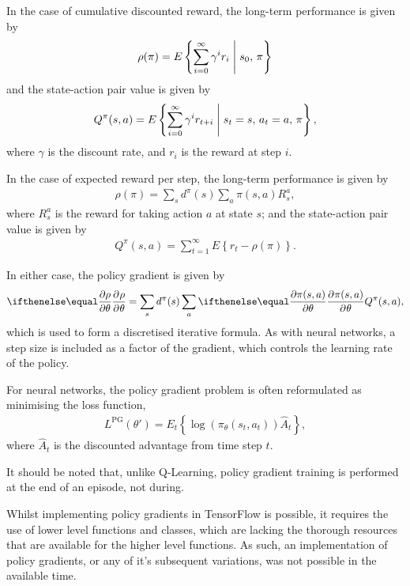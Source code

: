 In the case of cumulative discounted reward, the long-term performance is given
by
\begin{align*}
    \rho(\pi) = E\left\{
        \sum_{i=0}^{\infty} \gamma^{i}r_{i}
        \;\middle|\; s_0,\, \pi
    \right\}
\end{align*}
and the state-action pair value is given by
\begin{align*}
    Q^\pi(s,a) = E\left\{
        \sum_{i=0}^{\infty} \gamma^{i}r_{t+i}
        \;\middle|\; s_t=s,\, a_t=a,\, \pi
    \right\},
\end{align*}
where $\gamma$ is the discount rate, and $r_i$ is the reward at step $i$.

In the case of expected reward per step, the long-term performance is given by
\begin{align*}
    \rho(\pi) = \sum_s d^\pi(s) \sum_a \pi(s,a) R_s^a,
\end{align*}
where $R_s^a$ is the reward for taking action $a$ at state $s$;
and the state-action pair value is given by
\begin{align*}
    Q^\pi(s,a) = \sum_{t=1}^{\infty} E\left\{
        r_t - \rho(\pi)
    \right\}.
\end{align*}

In either case, the policy gradient is given by
\begin{align*}
    \Rpdiff{\rho}{\theta} =
    \sum_s d^\pi(s)
    \sum_a \Rpdiff{\pi(s,a)}{\theta}
    Q^\pi(s,a),
\end{align*}
which is used to form a discretised iterative formula.
As with neural networks, a step size is included as a factor of the
gradient, which controls the learning rate of the policy.

For neural networks, the policy gradient problem is often reformulated as
minimising the loss function,
\begin{align*}
    L^\text{PG}(\theta') = E_t\left\{
        \log(\pi_\theta(s_t,a_t))\hat{A}_t
    \right\},
\end{align*}
where $\hat{A}_t$ is the discounted advantage from time step $t$.

It should be noted that, unlike Q-Learning, policy gradient training is
performed at the end of an episode, not during.

Whilst implementing policy gradients in TensorFlow is possible, it requires the
use of lower level functions and classes, which are lacking the thorough
resources that are available for the higher level functions.
As such, an implementation of policy gradients, or any of it's subsequent
variations, was not possible in the available time.



